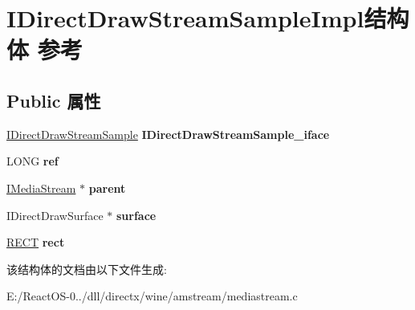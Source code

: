 \hypertarget{struct_i_direct_draw_stream_sample_impl}{}\section{I\+Direct\+Draw\+Stream\+Sample\+Impl结构体 参考}
\label{struct_i_direct_draw_stream_sample_impl}
\subsection*{Public 属性}
\begin{DoxyCompactItemize}
\item 
\mbox{\label{struct_i_direct_draw_stream_sample_impl_ac948284adab0d91d6b02e0cfadfb9777}} 
\hyperlink{interface_i_direct_draw_stream_sample}{I\+Direct\+Draw\+Stream\+Sample} {\bfseries I\+Direct\+Draw\+Stream\+Sample\+\_\+iface}
\item 
\mbox{\label{struct_i_direct_draw_stream_sample_impl_aa82c8476aaef1eaf62f0ed48663cbf9b}} 
L\+O\+NG {\bfseries ref}
\item 
\mbox{\label{struct_i_direct_draw_stream_sample_impl_a34d741ee095289ac02c454f0d8ddc119}} 
\hyperlink{interface_i_media_stream}{I\+Media\+Stream} $\ast$ {\bfseries parent}
\item 
\mbox{\label{struct_i_direct_draw_stream_sample_impl_a975933cd5ea9a28ed8602adc305f6da6}} 
I\+Direct\+Draw\+Surface $\ast$ {\bfseries surface}
\item 
\mbox{\label{struct_i_direct_draw_stream_sample_impl_aa20c9c4227c8a806da3bdcd88fa2d23e}} 
\hyperlink{structtag_r_e_c_t}{R\+E\+CT} {\bfseries rect}
\end{DoxyCompactItemize}


该结构体的文档由以下文件生成\+:\begin{DoxyCompactItemize}
\item 
E\+:/\+React\+O\+S-\/0../dll/directx/wine/amstream/mediastream.\+c\end{DoxyCompactItemize}
